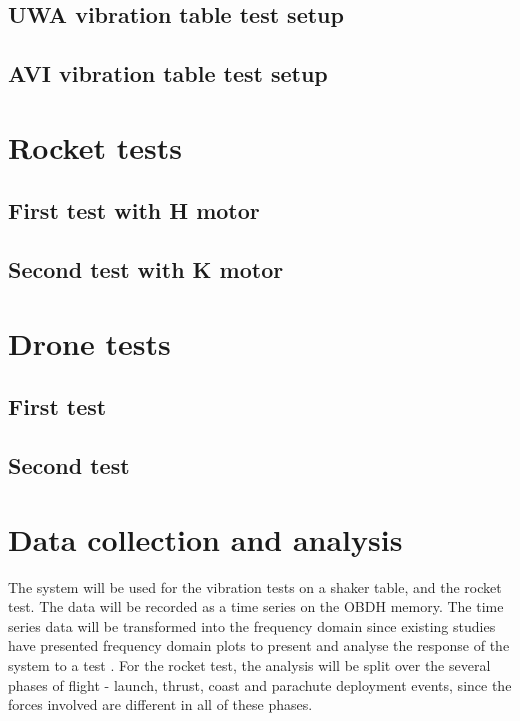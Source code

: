 \documentclass[a4paper,11pt]{article}
\begin{document}
\subsection{UWA vibration table test setup}
\subsection{AVI vibration table test setup}

\section{Rocket tests}
\subsection{First test with H motor}
\subsection{Second test with K motor}

\section{Drone tests}
\subsection{First test}
\subsection{Second test}


\section{Data collection and analysis}

The system will be used for the vibration tests on a shaker table, and the rocket test. The data will be recorded as a time series on the OBDH memory. The time series data will be transformed into the frequency domain since existing studies have presented frequency domain plots to present and analyse the response of the system to a test \cite{nasa-pyroshock,nieto2019cubesat}. For the rocket test, the analysis will be split over the several phases of flight - launch, thrust, coast and parachute deployment events, since the forces involved are different in all of these phases.
\end{document}
